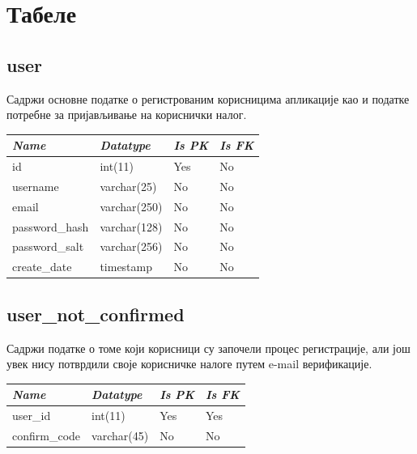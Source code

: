 \section{Табеле}

\subsection{user}
Садржи основне податке о регистрованим корисницима апликације као и податке потребне за
пријављивање на кориснички налог.

\begin{table}[h!]
\centering
\small

    \begin{tabular}{ | m{} | m{} | m{} | m{} | }
    \hline
        \cellcolor{blue!25}\textbf{\textit{Name}} &

        \cellcolor{blue!25}\textbf{\textit{Datatype}} &
        \cellcolor{blue!25}\textbf{\textit{Is PK}} &
        \cellcolor{blue!25}\textbf{\textit{Is FK}} \\
    \hline
    \hline
        id & int(11) & Yes & No \\
    \hline
        username & varchar(25) & No & No \\
    \hline
        email & varchar(250) & No & No \\
    \hline
        password\_hash & varchar(128) & No & No \\
    \hline
        password\_salt & varchar(256) & No & No \\
    \hline
        create\_date & timestamp & No & No \\
    \hline
    \end{tabular}

\end{table}



\subsection{user\_not\_confirmed}
Садржи податке о томе који корисници су започели процес регистрације, али још увек нису потврдили
своје корисничке налоге путем e-mail верификације.

\begin{table}[h!]
\centering
\small

    \begin{tabular}{ | m{} | m{} | m{} | m{} | }
    \hline
        \cellcolor{blue!25}\textbf{\textit{Name}} &

        \cellcolor{blue!25}\textbf{\textit{Datatype}} &
        \cellcolor{blue!25}\textbf{\textit{Is PK}} &
        \cellcolor{blue!25}\textbf{\textit{Is FK}} \\
    \hline
    \hline
        user\_id & int(11) & Yes & Yes \\
    \hline
        confirm\_code & varchar(45) & No & No \\
    \hline
    \end{tabular}

\end{table}

